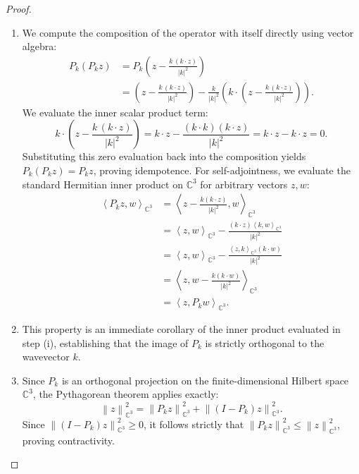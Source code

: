 \documentclass[12pt,a4paper]{article}
\theoremstyle{plain}
\theoremstyle{definition}
\theoremstyle{remark}
\newcommand{\norm}[1]{\left\|#1\right\|}
\newcommand{\inner}[2]{\left\langle #1, #2 \right\rangle}
\begin{document}
\begin{proof}
\begin{enumerate}[label=(\roman*)]
  \item We compute the composition of the operator with itself directly using vector algebra:
  \begin{align*}
    P_k(P_k z)
    &= P_k \left( z - \frac{k\,(k\cdot z)}{|k|^2} \right) \\
    &= \left( z - \frac{k\,(k\cdot z)}{|k|^2} \right) - \frac{k}{|k|^2} \left( k \cdot \left( z - \frac{k\,(k\cdot z)}{|k|^2} \right) \right).
  \end{align*}
  We evaluate the inner scalar product term:
  \[
    k \cdot \left( z - \frac{k\,(k\cdot z)}{|k|^2} \right) = k \cdot z - \frac{(k \cdot k)(k \cdot z)}{|k|^2} = k \cdot z - k \cdot z = 0.
  \]
  Substituting this zero evaluation back into the composition yields $P_k(P_k z) = P_k z$, proving idempotence. For self-adjointness, we evaluate the standard Hermitian inner product on $\mathbb{C}^3$ for arbitrary vectors $z, w$:
  \begin{align*}
    \inner{P_k z}{w}_{\mathbb{C}^3}
    &= \inner{z - \frac{k(k\cdot z)}{|k|^2}}{w}_{\mathbb{C}^3} \\
    &= \inner{z}{w}_{\mathbb{C}^3} - \frac{(k\cdot z)\inner{k}{w}_{\mathbb{C}^3}}{|k|^2} \\
    &= \inner{z}{w}_{\mathbb{C}^3} - \frac{\inner{z}{k}_{\mathbb{C}^3}(k\cdot w)}{|k|^2} \\
    &= \inner{z}{w - \frac{k(k\cdot w)}{|k|^2}}_{\mathbb{C}^3} \\
    &= \inner{z}{P_k w}_{\mathbb{C}^3}.
  \end{align*}

  \item This property is an immediate corollary of the inner product evaluated in step (i), establishing that the image of $P_k$ is strictly orthogonal to the wavevector $k$.

  \item Since $P_k$ is an orthogonal projection on the finite-dimensional Hilbert space $\mathbb{C}^3$, the Pythagorean theorem applies exactly:
  \[
    \norm{z}_{\mathbb{C}^3}^2 = \norm{P_k z}_{\mathbb{C}^3}^2 + \norm{(I - P_k) z}_{\mathbb{C}^3}^2.
  \]
  Since $\norm{(I - P_k) z}_{\mathbb{C}^3}^2 \ge 0$, it follows strictly that $\norm{P_k z}_{\mathbb{C}^3}^2 \le \norm{z}_{\mathbb{C}^3}^2$, proving contractivity.


\end{enumerate}
\end{proof}
\end{document}
